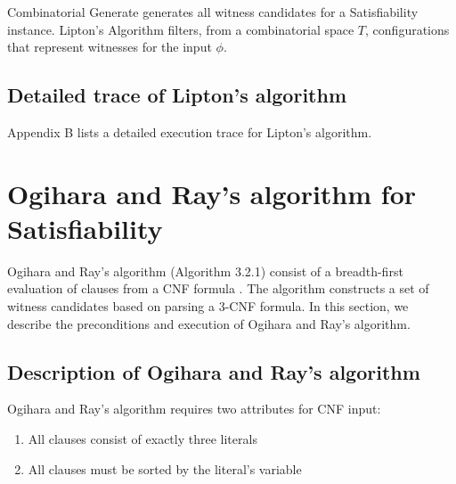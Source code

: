 
{\sc Combinatorial Generate} generates all witness candidates for a {\sc Satisfiability} instance.  {\sc Lipton's Algorithm} filters, from a combinatorial space $T$, configurations that represent witnesses for the input $\phi$.


	
\FloatBarrier



	
	\subsection{Detailed trace of Lipton's algorithm}
	
Appendix B lists a detailed execution trace for Lipton's algorithm.
	



\section{Ogihara and Ray's algorithm for {\sc Satisfiability}}


Ogihara and Ray's algorithm (Algorithm 3.2.1) consist of a breadth-first evaluation of clauses from a CNF formula \cite{Ogihara:1996:BFS:898228,Ogihara97dna-basedparallel}.  The algorithm constructs a set of witness candidates based on parsing a 3-CNF formula.  In this section, we describe the preconditions and execution of Ogihara and Ray's algorithm.

\subsection{Description of Ogihara and Ray's algorithm}
		
Ogihara and Ray's algorithm requires two attributes for CNF input:

\begin{enumerate}
\item All clauses consist of exactly three literals
\item All clauses must be sorted by the literal's variable
\end{enumerate}

